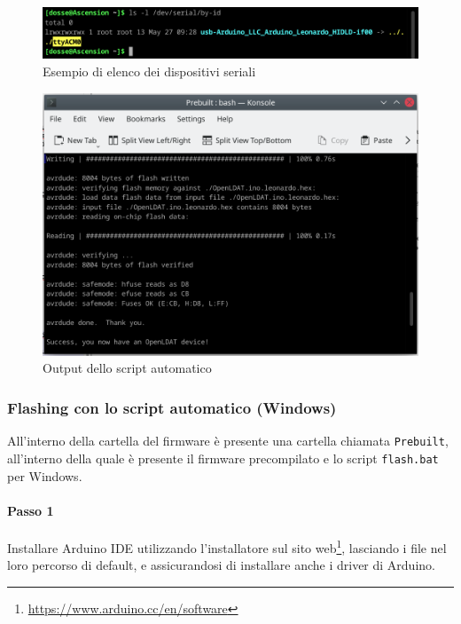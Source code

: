\begin{figure}[H]
	\centering
	\includegraphics[width=\textwidth]{Dispositivo_files/flashing_01.png}
	\caption{Esempio di elenco dei dispositivi seriali}
	\label{fig:flashing_01}
\end{figure}

\begin{figure}[H]
	\centering
	\includegraphics[width=\textwidth]{Dispositivo_files/flashing_02.png}
	\caption{Output dello script automatico}
	\label{fig:flashing_02}
\end{figure}

\subsubsection{Flashing con lo script automatico (Windows)}
All'interno della cartella del firmware è presente una cartella chiamata \texttt{Prebuilt}, all'interno della quale è presente il firmware precompilato e lo script \texttt{flash.bat} per Windows.

\paragraph{Passo 1} Installare Arduino IDE utilizzando l'installatore sul sito web\footnote{\href{https://www.arduino.cc/en/software}{https://www.arduino.cc/en/software}}, lasciando i file nel loro percorso di default, e assicurandosi di installare anche i driver di Arduino.

